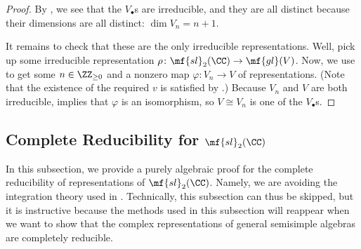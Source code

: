\documentclass[../notes.tex]{subfiles}
\begin{document}
\begin{proof}
	By , we see that the $V_\bullet$s are irreducible, and they are all distinct because their dimensions are all distinct: $\dim V_n=n+1$.
	
	It remains to check that these are the only irreducible representations. Well, pick up some irreducible representation $\rho\colon\mf{sl}_2(\CC)\to\mf{gl}(V)$. Now, we use  to get some $n\in\ZZ_{\ge0}$ and a nonzero map $\varphi\colon V_n\to V$ of representations. (Note that the existence of the required $v$ is satisfied by .) Because $V_n$ and $V$ are both irreducible,  implies that $\varphi$ is an isomorphism, so $V\cong V_n$ is one of the $V_\bullet$s.
\end{proof}

\subsection{Complete Reducibility for \texorpdfstring{$\mf{sl}_2(\CC)$}{sl2(C)}}
In this subsection, we provide a purely algebraic proof for the complete reducibility of representations of $\mf{sl}_2(\CC)$. Namely, we are avoiding the integration theory used in . Technically, this subsection can thus be skipped, but it is instructive because the methods used in this subsection will reappear when we want to show that the complex representations of general semisimple algebras are completely reducible.
\end{document}
